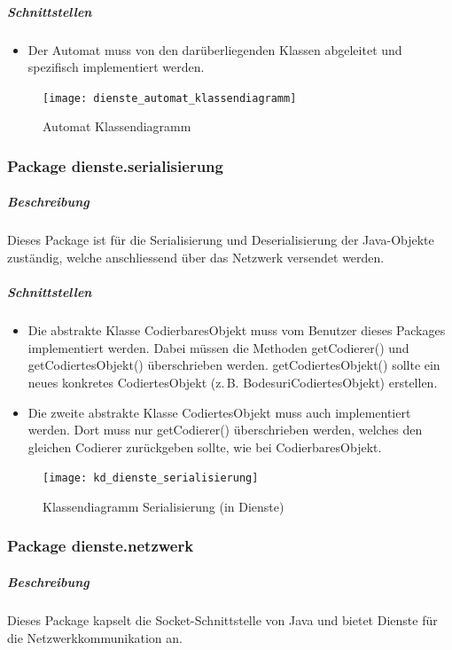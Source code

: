 \documentclass[12pt,halfparskip]{scrartcl}
\begin{document}
\subparagraph{Schnittstellen} %
\label{ssub:schnittstellen}
\begin{itemize}
	\item Der Automat muss von den darüberliegenden Klassen abgeleitet und spezifisch implementiert werden.
\end{itemize}	

\begin{figure}[h]
	\centering
	\texttt{[image: dienste\_automat\_klassendiagramm]}
	\caption{Automat Klassendiagramm}
	\label{fig:dienste_serialisierung}
\end{figure}


\clearpage
\subsubsection{Package dienste.serialisierung}

\subparagraph{Beschreibung}
Dieses Package ist für die Serialisierung und Deserialisierung der Java-Objekte zuständig, welche anschliessend über das Netzwerk versendet werden.

\subparagraph{Schnittstellen}
\begin{itemize}
	\item Die abstrakte Klasse CodierbaresObjekt muss vom Benutzer dieses Packages implementiert werden. Dabei müssen die Methoden getCodierer() und getCodiertesObjekt() überschrieben werden. getCodiertesObjekt() sollte ein neues konkretes CodiertesObjekt (z.\,B. BodesuriCodiertesObjekt) erstellen.
	\item Die zweite abstrakte Klasse CodiertesObjekt muss auch implementiert werden. Dort muss nur getCodierer() überschrieben werden, welches den gleichen Codierer zurückgeben sollte, wie bei CodierbaresObjekt.
\end{itemize}

\begin{figure}[h]
	\centering
	\texttt{[image: kd\_dienste\_serialisierung]}
	\caption{Klassendiagramm Serialisierung (in Dienste)}
	\label{fig:kd_dienste_serialisierung}
\end{figure}

\clearpage
\subsubsection{Package dienste.netzwerk} %
\label{ssub:package_dienste_netzwerk}
\subparagraph{Beschreibung}
Dieses Package kapselt die Socket-Schnittstelle von Java und bietet Dienste für die Netzwerkkommunikation an.
\end{document}
